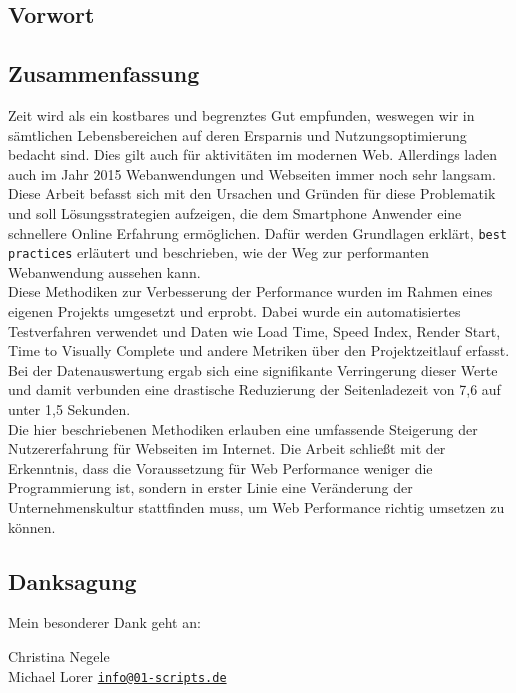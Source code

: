 \begin{newpage}
	\vspace*{\fill}
	\section*{Vorwort}
	\subsection*{Zusammenfassung}
		Zeit wird als ein kostbares und begrenztes Gut empfunden, weswegen wir in sämtlichen Lebensbereichen auf deren Ersparnis und Nutzungsoptimierung bedacht sind. Dies gilt auch für aktivitäten im modernen Web. Allerdings laden auch im Jahr 2015 Webanwendungen und Webseiten immer noch sehr langsam. Diese Arbeit befasst sich mit den Ursachen und Gründen für diese Problematik und soll Lösungsstrategien aufzeigen, die dem Smartphone Anwender eine schnellere Online Erfahrung ermöglichen. Dafür werden Grundlagen erklärt, \texttt{best practices} erläutert und beschrieben, wie der Weg zur performanten Webanwendung aussehen kann.\\
		Diese Methodiken zur Verbesserung der Performance wurden im Rahmen eines eigenen Projekts umgesetzt und erprobt. Dabei wurde ein automatisiertes Testverfahren verwendet und Daten wie Load Time, Speed Index, Render Start, Time to Visually Complete und andere Metriken über den Projektzeitlauf erfasst. Bei der Datenauswertung ergab sich eine signifikante Verringerung dieser Werte und damit verbunden eine drastische Reduzierung der Seitenladezeit von 7,6 auf unter 1,5 Sekunden.\\
		Die hier beschriebenen Methodiken erlauben eine umfassende Steigerung der Nutzererfahrung für Webseiten im Internet. Die Arbeit schließt mit der Erkenntnis, dass die Voraussetzung für Web Performance weniger die Programmierung ist, sondern in erster Linie eine Veränderung der Unternehmenskultur stattfinden muss, um Web Performance richtig umsetzen zu können.

	\subsection*{Danksagung}
		Mein besonderer Dank geht an:
    \begin{flushleft}\large
		  \hspace*{0.5cm} Christina Negele\\
		  \hspace*{0.5cm} Michael Lorer
		  \hspace*{0.5cm} \href{mailto:info@01-scripts.de}{\nolinkurl{info@01-scripts.de}}\\
    \end{flushleft}
\end{newpage}


\newpage